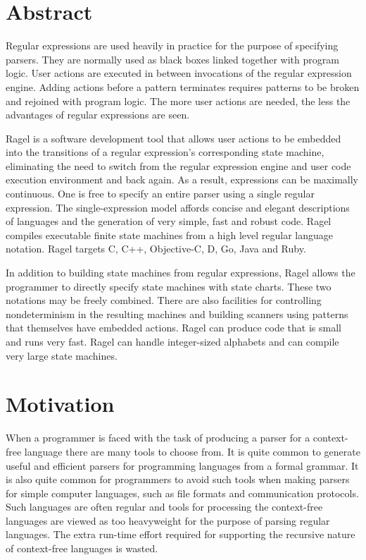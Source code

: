 \documentclass[letterpaper,11pt,oneside]{book}
\begin{document}
\section{Abstract}

Regular expressions are used heavily in practice for the purpose of specifying
parsers. They are normally used as black boxes linked together with program
logic.  User actions are executed in between invocations of the regular
expression engine. Adding actions before a pattern terminates requires patterns
to be broken and rejoined with program logic. The more user actions are needed,
the less the advantages of regular expressions are seen. 

Ragel is a software development tool that allows user actions to be 
embedded into the transitions of a regular expression's corresponding state
machine, eliminating the need to switch from the regular expression engine and
user code execution environment and back again. As a result, expressions can be
maximally continuous.  One is free to specify an entire parser using a single
regular expression.  The single-expression model affords concise and elegant
descriptions of languages and the generation of very simple, fast and robust
code.  Ragel compiles executable finite state machines from a high level regular language
notation. Ragel targets C, C++, Objective-C, D, Go, Java and Ruby.

In addition to building state machines from regular expressions, Ragel allows
the programmer to directly specify state machines with state charts. These two
notations may be freely combined. There are also facilities for controlling
nondeterminism in the resulting machines and building scanners using patterns
that themselves have embedded actions. Ragel can produce code that is small and
runs very fast. Ragel can handle integer-sized alphabets and can compile very
large state machines.

\section{Motivation}

When a programmer is faced with the task of producing a parser for a
context-free language there are many tools to choose from. It is quite common
to generate useful and efficient parsers for programming languages from a
formal grammar. It is also quite common for programmers to avoid such tools
when making parsers for simple computer languages, such as file formats and
communication protocols.  Such languages are often regular and tools for
processing the context-free languages are viewed as too heavyweight for the
purpose of parsing regular languages. The extra run-time effort required for
supporting the recursive nature of context-free languages is wasted.
\end{document}
